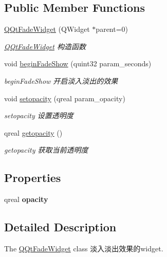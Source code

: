 \subsection*{Public Member Functions}
\begin{DoxyCompactItemize}
\item 
\mbox{\hyperlink{class_q_qt_fade_widget_a4ff66449736c51e0cac964b7cf39cb9d}{Q\+Qt\+Fade\+Widget}} (Q\+Widget $\ast$parent=0)
\begin{DoxyCompactList}\small\item\em \mbox{\hyperlink{class_q_qt_fade_widget}{Q\+Qt\+Fade\+Widget}} 构造函数 \end{DoxyCompactList}\item 
void \mbox{\hyperlink{class_q_qt_fade_widget_a6b0c7bfb2ecb67b493570c723f141876}{begin\+Fade\+Show}} (quint32 param\+\_\+seconds)
\begin{DoxyCompactList}\small\item\em begin\+Fade\+Show 开启淡入淡出的效果 \end{DoxyCompactList}\item 
void \mbox{\hyperlink{class_q_qt_fade_widget_a8f195e27ba76f89efaf22f459fa8411e}{setopacity}} (qreal param\+\_\+opacity)
\begin{DoxyCompactList}\small\item\em setopacity 设置透明度 \end{DoxyCompactList}\item 
qreal \mbox{\hyperlink{class_q_qt_fade_widget_a58708b389df89b55be734538a938e1a0}{getopacity}} ()
\begin{DoxyCompactList}\small\item\em getopacity 获取当前透明度 \end{DoxyCompactList}\end{DoxyCompactItemize}
\subsection*{Properties}
\begin{DoxyCompactItemize}
\item 
\mbox{\label{class_q_qt_fade_widget_ae4ccfa6b2b4fe70606e9bf6cd7ff930a}} 
qreal {\bfseries opacity}
\end{DoxyCompactItemize}


\subsection{Detailed Description}
The \mbox{\hyperlink{class_q_qt_fade_widget}{Q\+Qt\+Fade\+Widget}} class 淡入淡出效果的widget. 

